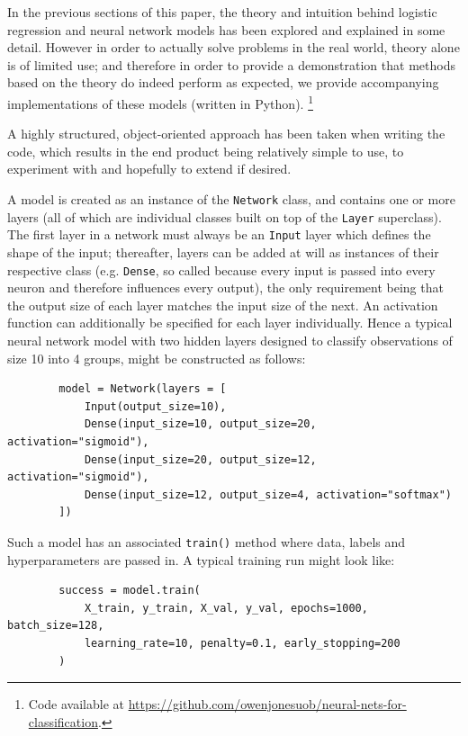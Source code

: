 \documentclass{article}[11pt]
\begin{document}
    In the previous sections of this paper, the theory and intuition behind logistic regression and neural network models has been explored and explained in some detail. However in order to actually solve problems in the real world, theory alone is of limited use; and therefore in order to provide a demonstration that methods based on the theory do indeed perform as expected, we provide accompanying implementations of these models (written in Python). \footnote{Code available at \url{https://github.com/owenjonesuob/neural-nets-for-classification}.}
    
    A highly structured, object-oriented approach has been taken when writing the code, which results in the end product being relatively simple to use, to experiment with and hopefully to extend if desired.
    
    A model is created as an instance of the \texttt{Network} class, and contains one or more layers (all of which are individual classes built on top of the \texttt{Layer} superclass). The first layer in a network must always be an \texttt{Input} layer which defines the shape of the input; thereafter, layers can be added at will as instances of their respective class (e.g. \texttt{Dense}, so called because every input is passed into every neuron and therefore influences every output), the only requirement being that the output size of each layer matches the input size of the next. An activation function can additionally be specified for each layer individually. Hence a typical neural network model with two hidden layers designed to classify observations of size 10 into 4 groups, might be constructed as follows:
    
    
    \begin{verbatim}
        model = Network(layers = [
            Input(output_size=10),
            Dense(input_size=10, output_size=20, activation="sigmoid"),
            Dense(input_size=20, output_size=12, activation="sigmoid"),
            Dense(input_size=12, output_size=4, activation="softmax")
        ])
    \end{verbatim}
    
    
    Such a model has an associated \texttt{train()} method where data, labels and hyperparameters are passed in. A typical training run might look like:
    
    
    \begin{verbatim}
        success = model.train(
            X_train, y_train, X_val, y_val, epochs=1000, batch_size=128,
            learning_rate=10, penalty=0.1, early_stopping=200
        )
    \end{verbatim}
    
\end{document}
